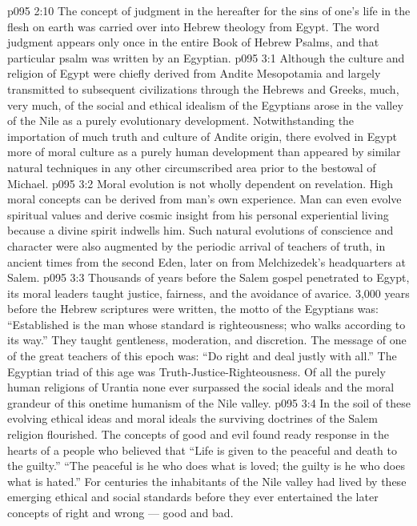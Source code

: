 \vs p095 2:10 The concept of judgment in the hereafter for the sins of one’s life in the flesh on earth was carried over into Hebrew theology from Egypt. The word judgment appears only once in the entire Book of Hebrew Psalms, and that particular psalm was written by an Egyptian.
\vs p095 3:1 Although the culture and religion of Egypt were chiefly derived from Andite Mesopotamia and largely transmitted to subsequent civilizations through the Hebrews and Greeks, much, very much, of the social and ethical idealism of the Egyptians arose in the valley of the Nile as a purely evolutionary development. Notwithstanding the importation of much truth and culture of Andite origin, there evolved in Egypt more of moral culture as a purely human development than appeared by similar natural techniques in any other circumscribed area prior to the bestowal of Michael.
\vs p095 3:2 Moral evolution is not wholly dependent on revelation. High moral concepts can be derived from man’s own experience. Man can even evolve spiritual values and derive cosmic insight from his personal experiential living because a divine spirit indwells him. Such natural evolutions of conscience and character were also augmented by the periodic arrival of teachers of truth, in ancient times from the second Eden, later on from Melchizedek’s headquarters at Salem.
\vs p095 3:3 Thousands of years before the Salem gospel penetrated to Egypt, its moral leaders taught justice, fairness, and the avoidance of avarice. 3,000 years before the Hebrew scriptures were written, the motto of the Egyptians was: “Established is the man whose standard is righteousness; who walks according to its way.” They taught gentleness, moderation, and discretion. The message of one of the great teachers of this epoch was: “Do right and deal justly with all.” The Egyptian triad of this age was Truth\hyp{}Justice\hyp{}Righteousness. Of all the purely human religions of Urantia none ever surpassed the social ideals and the moral grandeur of this onetime humanism of the Nile valley.
\vs p095 3:4 In the soil of these evolving ethical ideas and moral ideals the surviving doctrines of the Salem religion flourished. The concepts of good and evil found ready response in the hearts of a people who believed that “Life is given to the peaceful and death to the guilty.” “The peaceful is he who does what is loved; the guilty is he who does what is hated.” For centuries the inhabitants of the Nile valley had lived by these emerging ethical and social standards before they ever entertained the later concepts of right and wrong --- good and bad.
